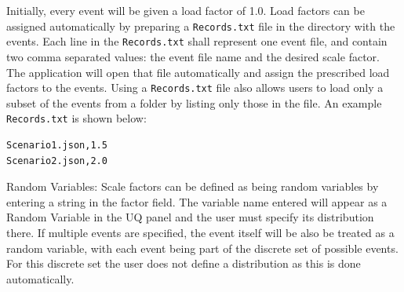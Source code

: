 Initially, every event will be given a load factor of 1.0. Load
factors can be assigned automatically by preparing
a \texttt{Records.txt} file in the directory with the events. Each
line in the \texttt{Records.txt} shall represent one event file, and
contain two comma separated values: the event file name and the
desired scale factor. The application will open that file
automatically and assign the prescribed load factors to the
events. Using a \texttt{Records.txt} file also allows users to load
only a subset of the events from a folder by listing only those in the
file. An example \texttt{Records.txt} is shown below:

\begin{verbatim}
Scenario1.json,1.5
Scenario2.json,2.0
\end{verbatim}

Random Variables: Scale factors can be defined as being random
variables by entering a string in the factor field. The variable name
entered will appear as a Random Variable in the UQ panel and the user
must specify its distribution there. If multiple events are specified,
the event itself will be also be treated as a random variable, with
each event being part of the discrete set of possible events. For this
discrete set the user does not define a distribution as this is done
automatically.
